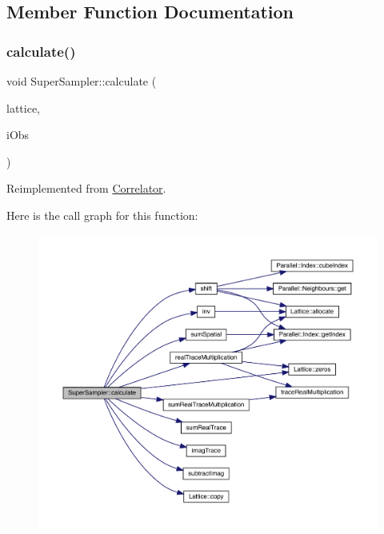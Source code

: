 \subsection{Member Function Documentation}
\mbox{\label{class_super_sampler_a7e1457583270077c4fbcb288ea9b954c}} 
\subsubsection{\texorpdfstring{calculate()}{calculate()}}
{\footnotesize\ttfamily void Super\+Sampler\+::calculate (\begin{DoxyParamCaption}\item[{\mbox{\hyperlink{class_lattice}{Lattice}}$<$ \mbox{\hyperlink{class_s_u3}{S\+U3}} $>$ $\ast$}]{lattice,  }\item[{unsigned int}]{i\+Obs }\end{DoxyParamCaption})\hspace{0.3cm}{\ttfamily [virtual]}}



Reimplemented from \mbox{\hyperlink{class_correlator_ab33502ff305f891c5c2e6d66a26a0247}{Correlator}}.

Here is the call graph for this function\+:\nopagebreak
\begin{figure}[H]
\begin{center}
\leavevmode
\includegraphics[width=350pt]{class_super_sampler_a7e1457583270077c4fbcb288ea9b954c_cgraph}
\end{center}
\end{figure}
\mbox{\label{class_super_sampler_a9f9155a519b2f60f029e92f641f54c9c}} 
